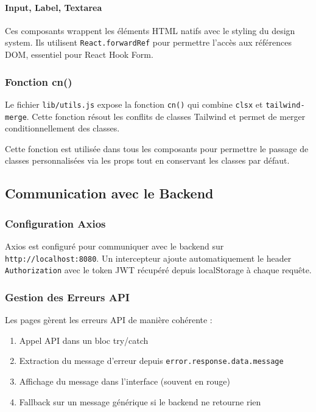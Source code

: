 \paragraph{Input, Label, Textarea}

Ces composants wrappent les éléments HTML natifs avec le styling du design system. Ils utilisent \texttt{React.forwardRef} pour permettre l'accès aux références DOM, essentiel pour React Hook Form.

\subsubsection{Fonction cn()}

Le fichier \texttt{lib/utils.js} expose la fonction \texttt{cn()} qui combine \texttt{clsx} et \texttt{tailwind-merge}. Cette fonction résout les conflits de classes Tailwind et permet de merger conditionnellement des classes.

Cette fonction est utilisée dans tous les composants pour permettre le passage de classes personnalisées via les props tout en conservant les classes par défaut.

\subsection{Communication avec le Backend}

\subsubsection{Configuration Axios}

Axios est configuré pour communiquer avec le backend sur \texttt{http://localhost:8080}. Un intercepteur ajoute automatiquement le header \texttt{Authorization} avec le token JWT récupéré depuis localStorage à chaque requête.

\subsubsection{Gestion des Erreurs API}

Les pages gèrent les erreurs API de manière cohérente :

\begin{enumerate}
    \item Appel API dans un bloc try/catch
    \item Extraction du message d'erreur depuis \texttt{error.response.data.message}
    \item Affichage du message dans l'interface (souvent en rouge)
    \item Fallback sur un message générique si le backend ne retourne rien
\end{enumerate}

